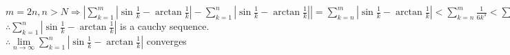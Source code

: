 \documentclass{article}
\begin{document}
$m=2n, n>N\Rightarrow\left|\sum \limits_{k=1}^m\left|\sin \displaystyle\frac{1}{k}-\arctan \frac{1}{k}\right|-\sum \limits_{k=1}^n\left|\sin \displaystyle\frac{1}{k}-\arctan \frac{1}{k}\right|\right|=\sum \limits_{k=n}^m\left|\sin \displaystyle\frac{1}{k}-\arctan \frac{1}{k}\right|<\sum \limits_{k=n}^m\frac{1}{6k^3}<\sum \limits_{k=n}^m\frac{1}{6n^3}=\frac{1}{6n^2}<\epsilon$\\

$\therefore$\qquad$\sum \limits_{k=1}^n\left|\sin \displaystyle\frac{1}{k}-\arctan \frac{1}{k}\right|$ is a cauchy sequence.\\

$\therefore$\qquad$\lim \limits_{n \to \infty}\sum \limits_{k=1}^n\left|\sin \displaystyle\frac{1}{k}-\arctan \frac{1}{k}\right|$ converges\\
\end{document}
